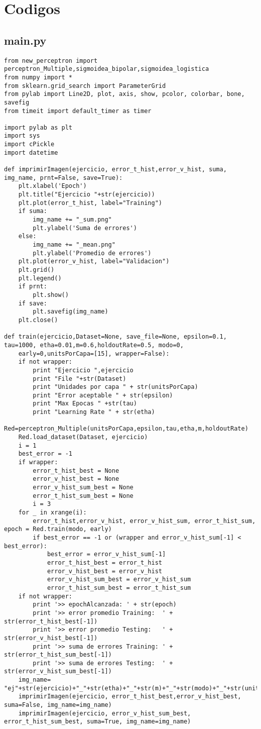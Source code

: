 \section{Codigos}
\subsection{main.py}

\begin{lstlisting}[caption=main.py]
from new_perceptron import perceptron_Multiple,sigmoidea_bipolar,sigmoidea_logistica
from numpy import *
from sklearn.grid_search import ParameterGrid
from pylab import Line2D, plot, axis, show, pcolor, colorbar, bone, savefig
from timeit import default_timer as timer 

import pylab as plt
import sys
import cPickle
import datetime

def imprimirImagen(ejercicio, error_t_hist,error_v_hist, suma, img_name, prnt=False, save=True):
	plt.xlabel('Epoch')
	plt.title("Ejercicio "+str(ejercicio))
	plt.plot(error_t_hist, label="Training")
	if suma:
		img_name += "_sum.png"
		plt.ylabel('Suma de errores')
	else:
		img_name += "_mean.png"
		plt.ylabel('Promedio de errores')
	plt.plot(error_v_hist, label="Validacion")
	plt.grid()
	plt.legend()
	if prnt:
		plt.show()
	if save:
		plt.savefig(img_name)
	plt.close()

def train(ejercicio,Dataset=None, save_file=None, epsilon=0.1, tau=1000, etha=0.01,m=0.6,holdoutRate=0.5, modo=0, 
	early=0,unitsPorCapa=[15], wrapper=False):
	if not wrapper:			
		print "Ejercicio ",ejercicio	
		print "File "+str(Dataset)
		print "Unidades por capa " + str(unitsPorCapa)
		print "Error aceptable " + str(epsilon)
		print "Max Epocas " +str(tau)
		print "Learning Rate " + str(etha)
	Red=perceptron_Multiple(unitsPorCapa,epsilon,tau,etha,m,holdoutRate)
	Red.load_dataset(Dataset, ejercicio)
	i = 1
	best_error = -1
	if wrapper:
		error_t_hist_best = None
		error_v_hist_best = None
		error_v_hist_sum_best = None
		error_t_hist_sum_best = None
		i = 3
	for _ in xrange(i):
		error_t_hist,error_v_hist, error_v_hist_sum, error_t_hist_sum, epoch = Red.train(modo, early)
		if best_error == -1 or (wrapper and error_v_hist_sum[-1] < best_error):
			best_error = error_v_hist_sum[-1]
			error_t_hist_best = error_t_hist
			error_v_hist_best = error_v_hist
			error_v_hist_sum_best = error_v_hist_sum
			error_t_hist_sum_best = error_t_hist_sum
	if not wrapper:
		print '>> epochAlcanzada: ' + str(epoch)
		print '>> error promedio Training:	' + str(error_t_hist_best[-1])
		print '>> error promedio Testing:	' + str(error_v_hist_best[-1])
		print '>> suma de errores Training:	' + str(error_t_hist_sum_best[-1])
		print '>> suma de errores Testing:	' + str(error_v_hist_sum_best[-1])	
	img_name= "ej"+str(ejercicio)+"_"+str(etha)+"_"+str(m)+"_"+str(modo)+"_"+str(unitsPorCapa)	
	imprimirImagen(ejercicio, error_t_hist_best,error_v_hist_best, suma=False, img_name=img_name)
	imprimirImagen(ejercicio, error_v_hist_sum_best, error_t_hist_sum_best, suma=True, img_name=img_name)
	

\end{lstlisting}
